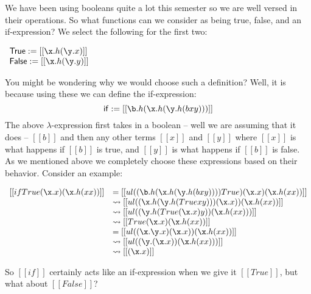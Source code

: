 \documentclass{article}
\newcommand {\redto}[0]{\rightsquigarrow}
\begin{document}
We have been using booleans quite a lot this semester so we are well
versed in their operations.  So what functions can we consider as
being true, false, and an if-expression?  We select the following for
the first two:
\begin{center}
  \begin{math}
    \begin{array}{lll}
      \mathsf{True}  := [[\x.h(\y.x)]]\\
      \mathsf{False} := [[\x.h(\y.y)]]\\
    \end{array}
  \end{math}
\end{center}
You might be wondering why we would choose such a definition?  Well,
it is because using these we can define the if-expression:
\[ \mathsf{if} := [[\b.h(\x.h(\y.h(b x y)))]] \] The above
$\lambda$-expression first takes in a boolean -- well we are assuming
that it does -- $[[b]]$ and then any other terms $[[x]]$ and $[[y]]$
where $[[x]]$ is what happens if $[[b]]$ is true, and $[[y]]$ is what
happens if $[[b]]$ is false.  As we mentioned above we completely
choose these expressions based on their behavior.  Consider an
example:
\begin{center}
  \begin{math}
    \begin{array}{lll}
      [[if True (\x.x) (\x.h(x x))]] 
      & = [[ul((\b.h(\x.h(\y.h(b x y)))) True) (\x.x) (\x.h(x x))]]\\
      & \redto [[ul((\x.h(\y.h(True x y))) (\x.x)) (\x.h(x x))]]\\
      & \redto [[ul((\y.h(True (\x.x) y)) (\x.h(x x)))]]\\
      & \redto [[True (\x.x) (\x.h(x x)) ]]\\
      & = [[ul((\x.\y.x) (\x.x)) (\x.h(x x)) ]]\\
      & \redto [[ul((\y. (\x.x)) (\x.h(x x))) ]]\\
      & \redto [[(\x.x)]]\\
    \end{array}
  \end{math}
\end{center}
So $[[if]]$ certainly acts like an if-expression when we give it
$[[True]]$, but what about $[[False]]$?
\end{document}
